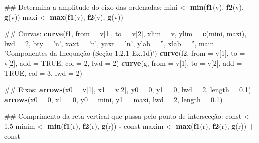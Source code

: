 \documentclass[]{book}
\newenvironment{Shaded}{\begin{snugshade}}{\end{snugshade}}
\newcommand{\KeywordTok}[1]{\textcolor[rgb]{0.13,0.29,0.53}{\textbf{#1}}}
\newcommand{\DataTypeTok}[1]{\textcolor[rgb]{0.13,0.29,0.53}{#1}}
\newcommand{\DecValTok}[1]{\textcolor[rgb]{0.00,0.00,0.81}{#1}}
\newcommand{\FloatTok}[1]{\textcolor[rgb]{0.00,0.00,0.81}{#1}}
\newcommand{\StringTok}[1]{\textcolor[rgb]{0.31,0.60,0.02}{#1}}
\newcommand{\OtherTok}[1]{\textcolor[rgb]{0.56,0.35,0.01}{#1}}
\newcommand{\OperatorTok}[1]{\textcolor[rgb]{0.81,0.36,0.00}{\textbf{#1}}}
\newcommand{\NormalTok}[1]{#1}
\begin{document}
\begin{enumerate}
\begin{Shaded}
\begin{Highlighting}[]
\NormalTok{##  Determina  a amplitude do eixo das ordenadas:}
\NormalTok{mini <-}\StringTok{ }\KeywordTok{min}\NormalTok{(}\KeywordTok{f1}\NormalTok{(v), }\KeywordTok{f2}\NormalTok{(v), }\KeywordTok{g}\NormalTok{(v))}
\NormalTok{maxi <-}\StringTok{ }\KeywordTok{max}\NormalTok{(}\KeywordTok{f1}\NormalTok{(v), }\KeywordTok{f2}\NormalTok{(v), }\KeywordTok{g}\NormalTok{(v))}

\NormalTok{##  Curvas:}
\KeywordTok{curve}\NormalTok{(f1, }\DataTypeTok{from =}\NormalTok{ v[}\DecValTok{1}\NormalTok{], }\DataTypeTok{to =}\NormalTok{ v[}\DecValTok{2}\NormalTok{], }\DataTypeTok{xlim =}\NormalTok{ v, }\DataTypeTok{ylim =} \KeywordTok{c}\NormalTok{(mini, maxi), }\DataTypeTok{lwd =} \DecValTok{2}\NormalTok{,}
  \DataTypeTok{bty =} \StringTok{'n'}\NormalTok{, }\DataTypeTok{xaxt =} \StringTok{'n'}\NormalTok{, }\DataTypeTok{yaxt =} \StringTok{'n'}\NormalTok{, }\DataTypeTok{ylab =} \StringTok{''}\NormalTok{, }\DataTypeTok{xlab =} \StringTok{''}\NormalTok{,}
  \DataTypeTok{main =} \StringTok{'Componentes da Inequação (Seção 1.2.1 Ex.1d)'}\NormalTok{)}
\KeywordTok{curve}\NormalTok{(f2, }\DataTypeTok{from =}\NormalTok{ v[}\DecValTok{1}\NormalTok{], }\DataTypeTok{to =}\NormalTok{ v[}\DecValTok{2}\NormalTok{], }\DataTypeTok{add =} \OtherTok{TRUE}\NormalTok{, }\DataTypeTok{col =} \DecValTok{2}\NormalTok{, }\DataTypeTok{lwd =} \DecValTok{2}\NormalTok{)}
\KeywordTok{curve}\NormalTok{(g, }\DataTypeTok{from =}\NormalTok{ v[}\DecValTok{1}\NormalTok{], }\DataTypeTok{to =}\NormalTok{ v[}\DecValTok{2}\NormalTok{], }\DataTypeTok{add =} \OtherTok{TRUE}\NormalTok{, }\DataTypeTok{col =} \DecValTok{3}\NormalTok{, }\DataTypeTok{lwd =} \DecValTok{2}\NormalTok{)}

\NormalTok{##  Eixos:}
\KeywordTok{arrows}\NormalTok{(}\DataTypeTok{x0 =}\NormalTok{ v[}\DecValTok{1}\NormalTok{], }\DataTypeTok{x1 =}\NormalTok{ v[}\DecValTok{2}\NormalTok{],}
   \DataTypeTok{y0 =} \DecValTok{0}\NormalTok{, }\DataTypeTok{y1 =} \DecValTok{0}\NormalTok{, }\DataTypeTok{lwd =} \DecValTok{2}\NormalTok{, }\DataTypeTok{length =} \FloatTok{0.1}\NormalTok{)}
\KeywordTok{arrows}\NormalTok{(}\DataTypeTok{x0 =} \DecValTok{0}\NormalTok{, }\DataTypeTok{x1 =} \DecValTok{0}\NormalTok{,}
   \DataTypeTok{y0 =}\NormalTok{ mini, }\DataTypeTok{y1 =}\NormalTok{ maxi, }\DataTypeTok{lwd =} \DecValTok{2}\NormalTok{, }\DataTypeTok{length =} \FloatTok{0.1}\NormalTok{)}

\NormalTok{##  Comprimento da reta vertical que passa pelo ponto de intersecção:}
\NormalTok{const <-}\StringTok{ }\FloatTok{1.5}
\NormalTok{minim <-}\StringTok{ }\KeywordTok{min}\NormalTok{(}\KeywordTok{f1}\NormalTok{(r), }\KeywordTok{f2}\NormalTok{(r), }\KeywordTok{g}\NormalTok{(r)) }\OperatorTok{-}\StringTok{ }\NormalTok{const}
\NormalTok{maxim <-}\StringTok{ }\KeywordTok{max}\NormalTok{(}\KeywordTok{f1}\NormalTok{(r), }\KeywordTok{f2}\NormalTok{(r), }\KeywordTok{g}\NormalTok{(r)) }\OperatorTok{+}\StringTok{ }\NormalTok{const}


\end{Highlighting}
\end{Shaded}
\end{enumerate}
\end{document}
